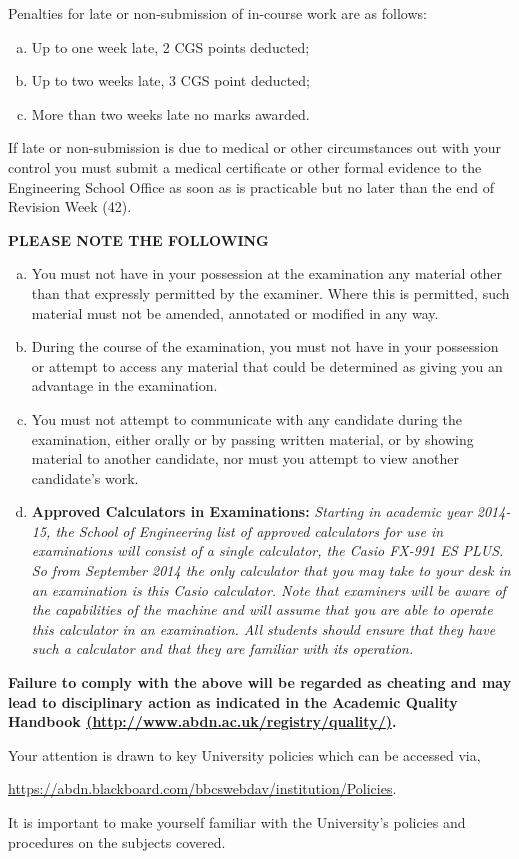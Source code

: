 \documentclass[12pts,a4paper,amsmath,amssymb,floatfix]{article}%
\begin{document}
\medskip

Penalties for late or non-submission of in-course work are as follows:
\begin{enumerate}[(a)]
\item Up to one week late, 2 CGS points deducted;
\item Up to two weeks late, 3 CGS point deducted;
\item More than two weeks late no marks awarded.
\end{enumerate}
If late or non-submission is due to medical or other circumstances out with your control you must submit a medical certificate or other formal evidence to the Engineering School Office as soon as is practicable but no later than the end of Revision Week (42).

{\large {\bf PLEASE NOTE THE FOLLOWING}}
\begin{enumerate}[(a)]
\item You must not have in your possession at the examination any material other than that expressly permitted by the examiner. Where this is permitted, such material must not be amended, annotated or modified in any way.
\item During the course of the examination, you must not have in your possession or attempt to access any material that could be determined as giving you an advantage in the examination.
\item You must not attempt to communicate with any candidate during the examination, either orally or by passing written material, or by showing material to another candidate, nor must you attempt to view another candidate's work.
\item {\bf Approved Calculators in Examinations:}  {\it Starting in academic year 2014-15, the School of Engineering list of approved calculators for use in examinations will consist of a single calculator, the Casio FX-991 ES PLUS.  So from September 2014 the only calculator that you may take to your desk in an examination is this Casio calculator.  Note that examiners will be aware of the capabilities of the machine and will assume that you are able to operate this calculator in an examination.  All students should ensure that they have such a calculator and that they are familiar with its operation.}
\end{enumerate}

\bigskip

{\bf Failure to comply with the above will be regarded as cheating and may lead to disciplinary action as indicated in the Academic Quality Handbook \href{http://www.abdn.ac.uk/registry/quality/}{(http://www.abdn.ac.uk/registry/quality/)}. 

\medskip

Your attention is drawn to key University policies which can be accessed via,
\begin{center}
\href{https://abdn.blackboard.com/bbcswebdav/institution/Policies}{https://abdn.blackboard.com/bbcswebdav/institution/Policies}.
\end{center}
It is important to make yourself familiar with the University's policies and procedures on the subjects covered.}
\end{document}
